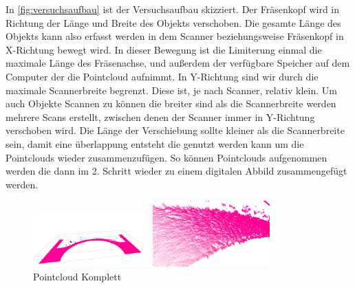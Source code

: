 \documentclass[../main.tex]{subfiles}
\begin{document}
In \ref*{fig:versuchsaufbau} ist der Versuchsaufbau skizziert.
Der Fräsenkopf wird in Richtung der Länge und Breite des Objekts verschoben.
Die gesamte Länge des Objekts kann also erfasst werden in dem Scanner 
beziehungsweise Fräsenkopf in X-Richtung bewegt wird. In dieser Bewegung 
ist die Limiterung einmal die maximale Länge des Fräsenachse, und außerdem der
verfügbare Speicher auf dem Computer der die Pointcloud aufnimmt.
In Y-Richtung sind wir durch die maximale Scannerbreite begrenzt. Diese ist, 
je nach Scanner, relativ klein.
Um auch Objekte Scannen zu können die breiter sind als die Scannerbreite werden
mehrere Scans erstellt, zwischen denen der Scanner immer in Y-Richtung 
verschoben wird. Die Länge der Verschiebung sollte kleiner als die 
Scannerbreite sein, damit eine überlappung entsteht die genutzt werden kann 
um die Pointclouds wieder zusammenzufügen. So können Pointclouds aufgenommen 
werden die dann im 2. Schritt wieder zu einem digitalen Abbild zusammengefügt 
werden.

\begin{figure}
    \begin{center}
        \includegraphics[width=0.4\textwidth]{images/pointcloud_big.PNG}
        \smallskip\par
        \includegraphics[width=0.4\textwidth]{images/pointcloud_small.PNG}
    \end{center}
    \caption{Pointcloud Komplett}
    \label{fig:pointclouds}
\end{figure}
\end{document}
